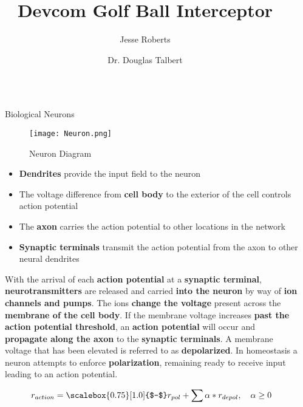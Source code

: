 \documentclass[final]{beamer}
\title{Devcom Golf Ball Interceptor}
\author{Jesse Roberts \inst{1} \and Dr. Douglas Talbert \inst{2}}
\institute[shortinst]{\inst{1} Vanderbilt University \samelineand \inst{2} Tennessee Technological University}
\newlength{\sepwidth}
\newlength{\colwidth}
\newcommand{\separatorcolumn}{\begin{column}{\sepwidth}\end{column}}
\newcommand{\minus}{\scalebox{0.75}[1.0]{$-$}}
\begin{document}
\begin{frame}[t]
\begin{columns}[t]
\separatorcolumn

\begin{column}{\colwidth}

  \begin{block}{Biological Neurons}

    \begin{figure}
      \centering
      \texttt{[image: Neuron.png]}
      \caption{Neuron Diagram}
    \end{figure}

    \begin{itemize}
      \item \textbf{Dendrites} provide the input field to the neuron
      \item The voltage difference from \textbf{cell body} to the exterior of the cell controls action potential
      \item The \textbf{axon} carries the action potential to other locations in the network
      \item \textbf{Synaptic terminals} transmit the action potential from the axon to other neural dendrites

    \end{itemize}

    With the arrival of each \textbf{action potential} at a \textbf{synaptic terminal}, \textbf{neurotransmitters} are released and carried \textbf{into the neuron} by way of \textbf{ion channels and pumps}. The ions \textbf{change the voltage} present across the \textbf{membrane of the cell body}. If the membrane voltage increases \textbf{past the action potential threshold}, an \textbf{action potential} will occur and \textbf{propagate along the axon} to the \textbf{synaptic terminals}. A membrane voltage that has been elevated is referred to as \textbf{depolarized}. In homeostasis a neuron attempts to enforce \textbf{polarization}, remaining ready to receive input leading to an action potential. 

    \begin{equation}
      \label{Formula:Neuron1}
      r_{action} = \minus r_{pol} + \sum  \alpha * r_{depol}, \quad \alpha \geq 0
    \end{equation}


\end{block}
\end{column}
\end{columns}
\end{frame}
\end{document}
